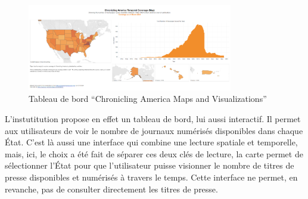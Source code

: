 \begin{figure}[h!]
	\centering
	\includegraphics[width=0.8\textwidth]{images/image15.png}
	\caption{Tableau de bord \enquote{Chronicling America Maps and Visualizations}}
	\label{fig:image15}
\end{figure}

L'instutitution propose en effet un tableau de bord, lui aussi interactif. Il permet aux utilisateurs de voir le nombre de journaux numérisés disponibles dans chaque État. C’est là aussi une interface qui combine une lecture spatiale et temporelle, mais, ici, le choix a été fait de séparer ces deux clés de lecture, la carte permet de sélectionner l’État pour que l’utilisateur puisse visionner le nombre de titres de presse disponibles et numérisés à travers le temps. Cette interface ne permet, en revanche, pas de consulter directement les titres de presse.



